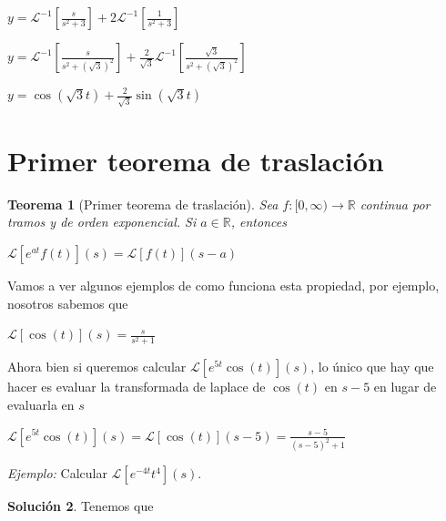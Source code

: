 \documentclass{article}
\theoremstyle{plain}
\newtheorem{thm}{Teorema}[section]
\theoremstyle{definition}
\newtheorem{sol}[thm]{Solución}
\begin{document}
\begin{center}
$\displaystyle y = \mathcal{L}^{-1}\left[ \frac{s}{s^2+3} \right] +  2\mathcal{L}^{-1} \left[ \frac{1}{s^2+3}\right] $
\end{center}

\begin{center}
$\displaystyle y = \mathcal{L}^{-1}\left[ \frac{s}{s^2+(\sqrt{3})^2} \right] +  \frac{2}{\sqrt{3}}\mathcal{L}^{-1} \left[ \frac{\sqrt{3}}{s^2+(\sqrt{3})^2}\right] $
\end{center}

\begin{center}
$\displaystyle y = \cos(\sqrt{3} t) +  \frac{2}{\sqrt{3}}\sin(\sqrt{3}t)$
\end{center}


\newpage


\section{Primer teorema de traslación}


\begin{thm}[Primer teorema de traslación]Sea $f: [0,\infty) \to \mathbb{R}$ continua por tramos y de orden exponencial. Si $a\in \mathbb{R}$, entonces
\end{thm}

\begin{center}
$\displaystyle \mathcal{L}[e^{at}f(t)](s) = \mathcal{L}[f(t)](s-a)$
\end{center}


Vamos a ver algunos ejemplos de como funciona esta propiedad, por ejemplo, nosotros sabemos que

\begin{center}
$\displaystyle\mathcal{L}[\cos(t)](s) = \frac{s}{s^2+1}$
\end{center}

Ahora bien si queremos calcular $\mathcal{L}[e^{5t}\cos(t)](s) $, lo único que hay que hacer es evaluar la transformada de laplace de $\cos(t)$ en $s-5$ en lugar de evaluarla en $s$

\begin{center}
$\displaystyle \mathcal{L}[e^{5t}\cos(t)](s) = \mathcal{L}[\cos(t)](s-5) = \frac{s-5}{(s-5)^2+1}$
\end{center}




\textit{Ejemplo:} Calcular $\mathcal{L}[e^{-4t}t^4](s)$. \\

\begin{sol}Tenemos que
\end{sol}
\end{document}
